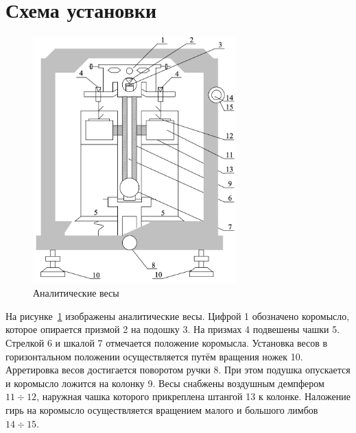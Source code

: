 \section{Схема установки}

\begin{figure}[h]
	\begin{center}
		\includegraphics[width=0.7\textwidth]{pictures/PictureOne}
		\caption{Аналитические весы}\label{PicOne}
	\end{center}
\end{figure}

На рисунке~\ref{PicOne} изображены аналитические весы. Цифрой 1 обозначено коромысло, которое опирается призмой 2 на подошку 3. На призмах 4 подвешены чашки 5. Стрелкой 6 и шкалой 7 отмечается положение коромысла. Установка весов в горизонтальном положении осуществляется путём вращения ножек 10. Арретировка весов достигается поворотом ручки 8. При этом подушка опускается и коромысло ложится на колонку 9. Весы снабжены воздушным демпфером $11\div12$, наружная чашка которого прикреплена штангой 13 к колонке. Наложение гирь на коромысло осуществляется вращением малого и большого лимбов $14\div15$.